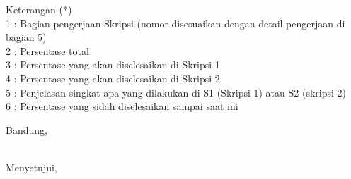 \documentclass[a4paper,twoside]{article}
\begin{document}
Keterangan (*)\\
1 : Bagian pengerjaan Skripsi (nomor disesuaikan dengan detail pengerjaan di bagian 5)\\
2 : Persentase total \\
3 : Persentase yang akan diselesaikan di Skripsi 1 \\
4 : Persentase yang akan diselesaikan di Skripsi 2 \\
5 : Penjelasan singkat apa yang dilakukan di S1 (Skripsi 1) atau S2 (skripsi 2)\\
6 : Persentase yang sidah diselesaikan sampai saat ini 

\vspace{1cm}
\centering Bandung, \tanggal\\
\vspace{2cm} \nama \\ 
\vspace{1cm}

Menyetujui, \\
\end{document}
